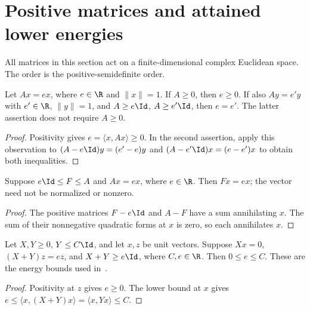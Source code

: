 \section{Positive matrices and attained lower energies}

All matrices in this section act on a finite-dimensional complex Euclidean
space. The order is the positive-semidefinite order.

\begin{theorem}
    \label{thm:normalized_eigenvector_energies}
    \leanok
    Let $Ax=ex$, where $e\in\R$ and $\|x\|=1$. If $A\ge0$, then $e\ge0$.
    If also $Ay=e'y$ with $e'\in\R$, $\|y\|=1$, and $A\ge e\Id$, $A\ge e'\Id$, then $e=e'$.
    The latter assertion does not require $A\ge0$.
\end{theorem}
\begin{proof}
    \leanok
    Positivity gives $e=\langle x,Ax\rangle\ge0$. In the second assertion,
    apply this observation to $(A-e\Id)y=(e'-e)y$ and
    $(A-e'\Id)x=(e-e')x$ to obtain both inequalities.
\end{proof}

\begin{theorem}
    \label{thm:order_sandwich_eigenvector}
    \leanok
    Suppose $e\Id\le F\le A$ and $Ax=ex$, where $e\in\R$.
    Then $Fx=ex$; the vector need not be normalized or nonzero.
\end{theorem}
\begin{proof}
    \leanok
    The positive matrices $F-e\Id$ and $A-F$ have a sum annihilating $x$.
    The sum of their nonnegative quadratic forms at $x$ is zero, so each
    annihilates $x$.
\end{proof}

\begin{theorem}
    \label{thm:positive_boundary_ground_energy}
    \leanok
    Let $X,Y\ge0$, $Y\le C\Id$, and let $x,z$ be unit vectors. Suppose
    $Xx=0$, $(X+Y)z=ez$, and $X+Y\ge e\Id$, where $C,e\in\R$.
    Then $0\le e\le C$. These are the energy bounds used
    in~\cite[lines 873--886 and 1010--1024]{Arad2016RigorousRG}.
\end{theorem}
\begin{proof}
    \leanok
    Positivity at $z$ gives $e\ge0$. The lower bound at $x$ gives
    $e\le\langle x,(X+Y)x\rangle=\langle x,Yx\rangle\le C$.
\end{proof}

